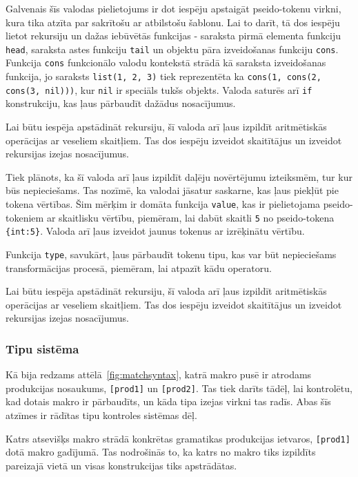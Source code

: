 Galvenais šīs valodas pielietojums ir dot iespēju apstaigāt pseido-tokenu virkni, kura tika atzīta par sakrītošu ar atbilstošu šablonu. Lai to darīt, tā dos iespēju lietot rekursiju un dažas iebūvētās funkcijas - saraksta pirmā elementa funkciju \verb|head|, saraksta astes funkciju \verb|tail| un objektu pāra izveidošanas funkciju \verb|cons|. Funkcija \verb|cons| funkcionālo valodu kontekstā strādā kā saraksta izveidošanas funkcija, jo saraksts \verb|list(1, 2, 3)| tiek reprezentēta ka \verb|cons(1, cons(2, cons(3, nil)))|, kur \verb|nil| ir speciāls tukšs objekts. Valoda saturēs arī \verb|if| konstrukciju, kas ļaus pārbaudīt dažādus nosacījumus.

Lai būtu iespēja apstādināt rekursiju, šī valoda arī ļaus izpildīt aritmētiskās operācijas ar veseliem skaitļiem. Tas dos iespēju izveidot skaitītājus un izveidot rekursijas izejas nosacījumus.

Tiek plānots, ka šī valoda arī ļaus izpildīt daļēju novērtējumu izteiksmēm, tur kur būs nepieciešams. Tas nozīmē, ka valodai jāsatur saskarne, kas ļaus piekļūt pie tokena vērtības. Šim mērķim ir domāta funkcija \verb|value|, kas ir pielietojama pseido-tokeniem ar skaitlisku vērtību, piemēram, lai dabūt skaitli \verb|5| no pseido-tokena \verb|{int:5}|. Valoda arī ļaus izveidot jaunus tokenus ar izrēķinātu vērtību.

Funkcija \verb|type|, savukārt, ļaus pārbaudīt tokenu tipu, kas var būt nepieciešams transformācijas procesā, piemēram, lai atpazīt kādu operatoru.

Lai būtu iespēja apstādināt rekursiju, šī valoda arī ļaus izpildīt aritmētiskās operācijas ar veseliem skaitļiem. Tas dos iespēju izveidot skaitītājus un izveidot rekursijas izejas nosacījumus.

\subsubsection{\label{sbsbs:sys_typesystem}Tipu sistēma}


Kā bija redzams attēlā~\ref{fig:matchsyntax}, katrā makro pusē ir atrodams produkcijas nosaukums, \verb|[prod1]| un \verb|[prod2]|. Tas tiek darīts tādēļ, lai kontrolētu, kad dotais makro ir pārbaudīts, un kāda tipa izejas virkni tas radīs. Abas šīs atzīmes ir rādītas tipu kontroles sistēmas dēļ.

Katrs atsevišķs makro strādā konkrētas gramatikas produkcijas ietvaros, \verb|[prod1]| dotā makro gadījumā. Tas nodrošinās to, ka katrs no makro tiks izpildīts pareizajā vietā un visas konstrukcijas tiks apstrādātas. 

